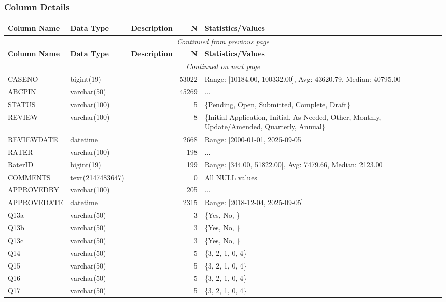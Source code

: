 \begin{landscape}
\subsubsection{Column Details}
\begin{longtable}{|l|l|l|r|p{6cm}|}
\hline
\textbf{Column Name} & \textbf{Data Type} & \textbf{Description} & \textbf{N} & \textbf{Statistics/Values} \\
\hline
\endfirsthead
\multicolumn{5}{c}{\textit{Continued from previous page}} \\
\hline
\textbf{Column Name} & \textbf{Data Type} & \textbf{Description} & \textbf{N} & \textbf{Statistics/Values} \\
\hline
\endhead
\hline
\multicolumn{5}{c}{\textit{Continued on next page}} \\
\endfoot
\hline
\endlastfoot
CASENO & bigint(19) &  & 53022 & Range: [10184.00, 100332.00], Avg: 43620.79, Median: 40795.00 \\
\hline
ABCPIN & varchar(50) &  & 45269 & ... \\
\hline
STATUS & varchar(100) &  & 5 & \{Pending, Open, Submitted, Complete, Draft\} \\
\hline
REVIEW & varchar(100) &  & 8 & \{Initial Application, Initial, As Needed, Other, Monthly, Update/Amended, Quarterly, Annual\} \\
\hline
REVIEWDATE & datetime &  & 2668 & Range: [2000-01-01, 2025-09-05] \\
\hline
RATER & varchar(100) &  & 198 & ... \\
\hline
RaterID & bigint(19) &  & 199 & Range: [344.00, 51822.00], Avg: 7479.66, Median: 2123.00 \\
\hline
COMMENTS & text(2147483647) &  & 0 & All NULL values \\
\hline
APPROVEDBY & varchar(100) &  & 205 & ... \\
\hline
APPROVEDATE & datetime &  & 2315 & Range: [2018-12-04, 2025-09-05] \\
\hline
Q13a & varchar(50) &  & 3 & \{Yes, No, \} \\
\hline
Q13b & varchar(50) &  & 3 & \{Yes, No, \} \\
\hline
Q13c & varchar(50) &  & 3 & \{Yes, No, \} \\
\hline
Q14 & varchar(50) &  & 5 & \{3, 2, 1, 0, 4\} \\
\hline
Q15 & varchar(50) &  & 5 & \{3, 2, 1, 0, 4\} \\
\hline
Q16 & varchar(50) &  & 5 & \{3, 2, 1, 0, 4\} \\
\hline
Q17 & varchar(50) &  & 5 & \{3, 2, 1, 0, 4\} \\

\end{longtable}
\end{landscape}
